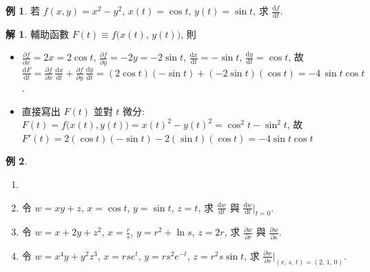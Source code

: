 \documentclass[12pt]{extarticle}
\newcommand{\ds}{\displaystyle}
\theoremstyle{definition}
\newtheorem*{ex}{例}
\newtheorem*{sol}{解}
\newcommand{\pdiff}[2]{\frac{\partial #1}{\partial #2}}
\newcommand{\diff}[2]{\frac{\mathrm{d} #1}{\mathrm{d} #2}}
\begin{document}
\begin{ex}
  若 $\ds f(x,y) = x^2 - y^2$, $x(t) = \cos t$, $y(t) = \sin t$, 求 $\ds\diff{f}{t}$. 
\end{ex}
\begin{sol}
  輔助函數 $\ds F(t)\equiv f\big(x(t),\,y(t)\big)$, 則
  \begin{itemize}\setlength{\itemsep}{0pt}
    \item $\ds\pdiff{f}{x} = 2x = 2\cos t$, $\ds\pdiff{f}{y} = -2y = -2\sin t$, $\ds\diff{x}{t} = -\sin t$, $\ds\diff{y}{t} = \cos t$, 故 $\ds\diff{F}{t} = \pdiff{f}{x}\,\diff{x}{t} + \pdiff{f}{y}\,\diff{y}{t} = (2\cos t)(-\sin t) + (-2\sin t)(\cos t) = -4\,\sin t\cos t$. 
    \item 直接寫出 $F(t)$ 並對 $t$ 微分: $\ds F(t) = f\big(x(t),y(t)\big) = x(t)^2 - y(t)^2 = \cos^2t - \sin^2t$, 故 $\ds F'(t) = 2(\cos t)(-\sin t)-2(\sin t)(\cos t) = -4 \sin t\cos t$
  \end{itemize}
\end{sol}

\begin{ex}
  \begin{enumerate}\setlength{\itemsep}{0pt}
    \item[]
    \item 令 $\ds w = xy + z$, $\ds x = \cos t$, $\ds y = \sin t$, $\ds z = t$, 求 $\ds\diff{w}{t}$ 與 $\ds\diff{w}{t}\Big|_{t = 0}$. 
    \item 令 $\ds w = x + 2y + z^2$, $\ds x = \frac{r}{s}$, $\ds y = r^2 + \ln s$, $\ds z = 2r$, 求 $\ds\pdiff{w}{r}$ 與 $\ds\pdiff{w}{s}$. 
    \item 令 $\ds w = x^4y + y^2z^3$, $\ds x = rse^{t}$, $\ds y = rs^2e^{-t}$, $\ds z = r^2s\sin t$, 求 $\ds\pdiff{w}{s}\Big|_{(r,\,s,\,t) = (2,\,1,\,0)}$. 
  \end{enumerate}
\end{ex}
\end{document}
